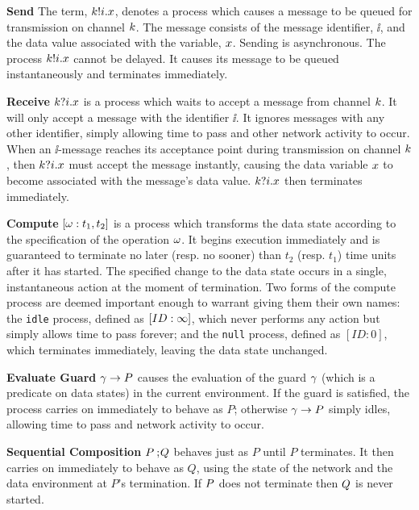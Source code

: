 \begin{trivlist}
\item[{\bf Send}]
The term, $\kk!\ii.\xx$, denotes a process which causes a
message to be queued for transmission on channel $\kk$. The message
consists of the message identifier, $\ii$, and the data value 
associated with the variable, $\xx$. Sending is asynchronous. The
process $\kk!\ii.\xx$ cannot be delayed. It causes its message
to be queued instantaneously and terminates immediately.

\item[{\bf Receive}]
$\kk?\ii.\xx$ is a process which waits to accept a message from
channel $\kk$. It will only accept a message with the identifier
$\ii$. It ignores messages with any other identifier, simply
allowing time to pass and other network activity to occur.  When an
$\ii$-message reaches its acceptance point during transmission on
channel $\kk$, then $\kk?\ii.\xx$ must accept the message instantly,
causing the data variable $\xx$ to become associated with the
message's data value.  $\kk?\ii.\xx$ then terminates immediately.

\item[{\bf Compute}]
$[\op : t_1, t_2]$ is a process which transforms the data state
according to the specification of the operation $\op$. It begins 
execution immediately and is guaranteed to terminate no later
(resp. no sooner) than $t_2$ (resp. $t_1$) time units after it has 
started. The specified change to the data state occurs in a 
single, instantaneous action at the moment of termination. Two forms of
the compute process are deemed important enough to warrant giving them
their own names: the \texttt{idle} process, defined as $[ID:\infinity]$,
which never performs any action but simply allows time to pass forever;
and the \texttt{null} process, defined as $[ID:0]$, which terminates
immediately, leaving the data state unchanged. 

\item[{\bf Evaluate Guard}]
$\g \guard \P$ causes the evaluation of the guard $\g$ (which is a
predicate on data states) in the current environment. If the guard is
satisfied, the process carries on immediately to behave as $P$;
otherwise $\g \guard \P$ simply idles, allowing time to pass and
network activity to occur.

\item[{\bf Sequential Composition}]
$P \sq Q$ behaves just as $P$ until $P$ terminates. It then carries
on immediately to behave as $Q$, using the state of the network and the data
environment at $P$'s termination. If $\P$ does not terminate then $\Q$ is never
started.


\end{trivlist}
